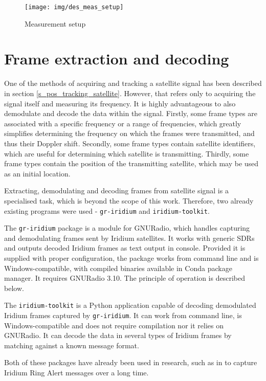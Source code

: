\begin{figure}
    \centering
    \texttt{[image: img/des\_meas\_setup]}
    \caption{Measurement setup}
    \label{f_des_meas_setup}
\end{figure}


\section{Frame extraction and decoding}
One of the methods of acquiring and tracking a satellite signal has been described in section \ref{s_pos_tracking_satellite}. However, that refers only to acquiring the signal itself and measuring its frequency. It is highly advantageous to also demodulate and decode the data within the signal. Firstly, some frame types are associated with a specific frequency or a range of frequencies, which greatly simplifies determining the frequency on which the frames were transmitted, and thus their Doppler shift. Secondly, some frame types contain satellite identifiers, which are useful for determining which satellite is transmitting. Thirdly, some frame types contain the position of the transmitting satellite, which may be used as an initial location.

Extracting, demodulating and decoding frames from satellite signal is a specialised task, which is beyond the scope of this work. Therefore, two already existing programs were used - \texttt{gr-iridium}\cite{des09} and \texttt{iridium-toolkit}\cite{des10}.

The \texttt{gr-iridium} package is a module for GNURadio, which handles capturing and demodulating frames sent by Iridium satellites. It works with generic SDRs and outputs decoded Iridium frames as text output in console. Provided it is supplied with proper configuration, the package works from command line and is Windows-compatible, with compiled binaries available in Conda package manager. It requires GNURadio 3.10. The principle of operation is described below.
 
The \texttt{iridium-toolkit} is a Python application capable of decoding demodulated Iridium frames captured by \texttt{gr-iridium}. It can work from command line, is Windows-compatible and does not require compilation nor it relies on GNURadio. It can decode the data in several types of Iridium frames by matching against a known message format.

Both of these packages have already been used in research, such as in \cite{sat08} to capture Iridium Ring Alert messages over a long time.

